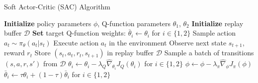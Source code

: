 \begin{algorithm}[H]
    \caption{Soft Actor-Critic (SAC) Algorithm}
    \begin{algorithmic}[1]
    \STATE \textbf{Initialize} policy parameters $\phi$, Q-function parameters $\theta_1$, $\theta_2$
    \STATE \textbf{Initialize} replay buffer $\mathcal{D}$
    \STATE \textbf{Set} target Q-function weights: $\bar{\theta}_i \leftarrow \theta_i$ for $i \in \{1, 2\}$
            \STATE Sample action $a_t \sim \pi_\theta(a_t|s_t)$
            \STATE Execute action $a_t$ in the environment
            \STATE Observe next state $s_{t+1}$, reward $r_t$
            \STATE Store $(s_t, a_t, r_t, s_{t+1})$ in replay buffer $\mathcal{D}$
        \ENDFOR
            \STATE Sample a batch of transitions $(s, a, r, s')$ from $\mathcal{D}$
            \STATE $\theta_i \leftarrow \theta_i - \lambda_Q \hat{\nabla}_{\theta_i}J_Q(\theta_i)$ for $i \in \{1, 2\}$
            \STATE $\phi \leftarrow \phi - \lambda_\pi \hat{\nabla}_\phi J_\pi(\phi)$
            \STATE $\bar{\theta}_i \leftarrow \tau \theta_i + (1 - \tau) \bar{\theta}_i$ for $i \in \{1, 2\}$ 
            
        \ENDFOR
    \ENDFOR
    \end{algorithmic}
    \end{algorithm}














